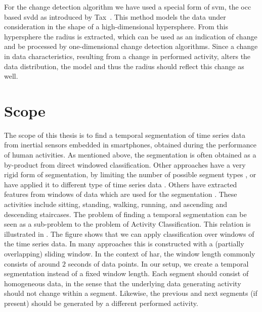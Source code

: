 For the change detection algorithm we have used a special form of \gls{svm}, the \gls{occ} based \gls{svdd} as introduced by Tax~\cite{tax2001one}.
This method models the data under consideration in the shape of a high-dimensional hypersphere.
From this hypersphere the radius is extracted, which can be used as an indication of change and be processed by one-dimensional change detection algorithms.
Since a change in data characteristics, resulting from a change in performed activity, alters the data distribution, the model and thus the radius should reflect this change as well.

\section{Scope}
The scope of this thesis is to find a temporal segmentation of time series data from inertial sensors embedded in smartphones, obtained during the performance of human activities.
As mentioned above, the segmentation is often obtained as a by-product from direct windowed classification.
Other approaches have a very rigid form of segmentation, \eg by limiting the number of possible segment types \cite{himberg2001time,chamroukhi2013joint}, or have applied it to different type of time series data \cite{li2007segmentation,fuchs2010online,guenterberg2009automatic}.
Others have extracted features from windows of data which are used for the segmentation \cite{guo2012adaptive}.
These activities include sitting, standing, walking, running, and ascending and descending staircases.
The problem of finding a temporal segmentation can be seen as a sub-problem to the problem of Activity Classification.
This relation is illustrated in .
The figure shows that we can apply classification over windows of the time series data.
In many approaches this is constructed with a (partially overlapping) sliding window.
In the context of \gls{har}, the window length commonly consists of around $2$ seconds of data points.
In our setup, we create a temporal segmentation instead of a fixed window length.
Each segment should consist of homogeneous data, in the sense that the underlying data generating activity should not change within a segment.
Likewise, the previous and next segments (if present) should be generated by a different performed activity.

